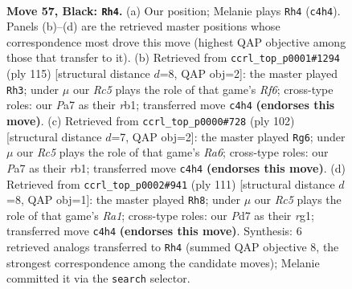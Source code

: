 \documentclass[11pt]{article}
\begin{document}
\clearpage

\begin{figure}[p]\centering
\begin{subfigure}{0.46\textwidth}\centering
\resizebox{\linewidth}{!}{%
\newchessgame
\chessboard[
  setfen={8/p2p4/2p2k2/8/2r5/5K2/8/8 b - - 1 57},
  showmover=false,
  pgfstyle=straightmove, color=movearrow, markmove={c4-h4}
]}
\caption{}
\end{subfigure}\hfill
\begin{subfigure}{0.46\textwidth}\centering
\resizebox{\linewidth}{!}{%
\newchessgame
\chessboard[
  setfen={8/5k2/P7/5p2/8/5r2/3K4/1R6 b - - 14 58},
  showmover=false,
  pgfstyle=straightmove, color=movearrow, markmove={f3-h3}
]}
\caption{}
\end{subfigure}
\\[4pt]
\begin{subfigure}{0.46\textwidth}\centering
\resizebox{\linewidth}{!}{%
\newchessgame
\chessboard[
  setfen={8/2k5/R7/6p1/P2K4/5P2/8/1r6 w - - 1 52},
  showmover=false,
  pgfstyle=straightmove, color=movearrow, markmove={a6-g6}
]}
\caption{}
\end{subfigure}\hfill
\begin{subfigure}{0.46\textwidth}\centering
\resizebox{\linewidth}{!}{%
\newchessgame
\chessboard[
  setfen={r7/5K2/8/8/3k4/p7/7P/6R1 b - - 10 56},
  showmover=false,
  pgfstyle=straightmove, color=movearrow, markmove={a8-h8}
]}
\caption{}
\end{subfigure}
\caption{\textbf{Move 57, Black: \texttt{Rh4}.} (a) Our position; Melanie plays \texttt{Rh4} (\texttt{c4h4}). Panels (b)--(d) are the retrieved master positions whose correspondence most drove this move (highest QAP objective among those that transfer to it). (b) Retrieved from \texttt{ccrl\_top\_p0001\#1294} (ply 115) [structural distance $d$=8, QAP obj=2]: the master played \texttt{Rh3}; under $\mu$ our \emph{Rc5} plays the role of that game's \emph{Rf6}; cross-type roles: our \emph{P}a7 as their \emph{r}b1; transferred move \texttt{c4h4} \textbf{(endorses this move)}. (c) Retrieved from \texttt{ccrl\_top\_p0000\#728} (ply 102) [structural distance $d$=7, QAP obj=2]: the master played \texttt{Rg6}; under $\mu$ our \emph{Rc5} plays the role of that game's \emph{Ra6}; cross-type roles: our \emph{P}a7 as their \emph{r}b1; transferred move \texttt{c4h4} \textbf{(endorses this move)}. (d) Retrieved from \texttt{ccrl\_top\_p0002\#941} (ply 111) [structural distance $d$=8, QAP obj=1]: the master played \texttt{Rh8}; under $\mu$ our \emph{Rc5} plays the role of that game's \emph{Ra1}; cross-type roles: our \emph{P}d7 as their \emph{r}g1; transferred move \texttt{c4h4} \textbf{(endorses this move)}. Synthesis: 6 retrieved analogs transferred to \texttt{Rh4} (summed QAP objective 8, the strongest correspondence among the candidate moves); Melanie committed it via the \texttt{search} selector.}
\label{fig:thought-m113}
\end{figure}
\end{document}
